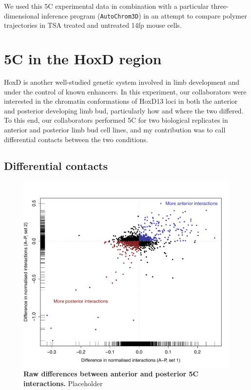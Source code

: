 \documentclass[a4paper,10pt,oneside]{book}
\begin{document}
We used this 5C experimental data in combination with a particular three-dimensional inference program  (\texttt{AutoChrom3D}\cite{Peng2013}) in an attempt to compare polymer trajectories in TSA treated and untreated 14fp mouse cells.

\section{5C in the HoxD region}

HoxD is another well-studied genetic system involved in limb development and under the control of known enhancers. In this experiment, our collaborators were interested in the chromatin conformations of HoxD13 loci in both the anterior and posterior developing limb bud, particularly how and where the two differed. To this end, our collaborators performed 5C for two biological replicates in anterior and posterior limb bud cell lines, and my contribution was to call differential contacts between the two conditions.



\subsection{Differential contacts}


\begin{figure}
\begin{center} 
\includegraphics[width=\textwidth]{figs/5cfc.pdf}
\captionsetup{width=\textwidth} 
\caption[Raw differences between anterior and posterior 5C interactions.]{ {\bf Raw differences between anterior and posterior 5C interactions. }
Placeholder
}\label{fig:5cfc}
\end{center} 
\end{figure} 
\end{document}

